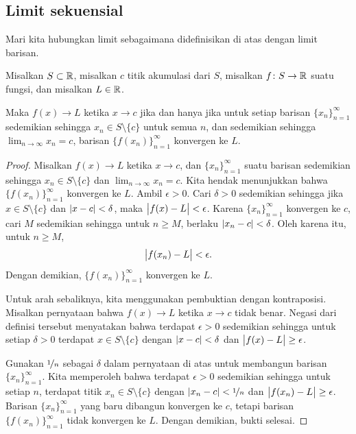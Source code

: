 \subsection{Limit sekuensial} \label{subseq:sequentiallimits}

Mari kita hubungkan limit sebagaimana didefinisikan di atas dengan limit barisan.

\begin{lemma}\label{seqflimit:lemma}
Misalkan $S \subset {\mathbb{R}}$, misalkan $c$ titik akumulasi dari $S$, misalkan $f \colon S \to
{\mathbb{R}}$ suatu fungsi, dan misalkan $L \in {\mathbb{R}}$.

Maka
$f(x) \to L$ ketika $x \to c$ jika dan hanya jika untuk setiap barisan
$\{ x_n \}_{n=1}^\infty$
sedemikian sehingga $x_n \in S \setminus \{c\}$ untuk semua $n$,
dan sedemikian sehingga $\lim_{n\to\infty} x_n = c$,
barisan $\bigl\{ f(x_n) \bigr\}_{n=1}^\infty$ konvergen ke $L$.
\end{lemma}

\begin{proof}
Misalkan
$f(x) \to L$ ketika $x \to c$, dan $\{ x_n \}_{n=1}^\infty$ suatu barisan
sedemikian sehingga
$x_n \in S \setminus \{c\}$ dan
$\lim_{n\to\infty} x_n = c$.
Kita hendak menunjukkan bahwa $\bigl\{ f(x_n) \bigr\}_{n=1}^\infty$ konvergen ke $L$.
Ambil $\epsilon > 0$.  Cari $\delta > 0$ sedemikian sehingga
jika $x \in S \setminus \{c\}$ dan $\lvert {x-c} \rvert < \delta$, maka
$\bigl\lvert {f(x) - L} \bigr\rvert < \epsilon$.  Karena
$\{ x_n \}_{n=1}^\infty$ konvergen ke $c$, cari $M$ sedemikian sehingga untuk $n \geq M$,
berlaku $\lvert {x_n - c} \rvert < \delta$.  Oleh karena itu, untuk $n \geq M$,
\begin{equation*}
\bigl\lvert {f(x_n) - L} \bigr\rvert < \epsilon .
\end{equation*}
Dengan demikian, $\bigl\{ f(x_n) \bigr\}_{n=1}^\infty$ konvergen ke $L$.

Untuk arah sebaliknya, kita menggunakan pembuktian dengan kontraposisi.  Misalkan
pernyataan bahwa $f(x) \to L$ ketika $x \to c$ tidak benar.  Negasi dari
definisi tersebut menyatakan bahwa terdapat $\epsilon > 0$ sedemikian sehingga untuk setiap
$\delta > 0$ terdapat $x \in S \setminus \{c\}$ dengan
$\lvert {x-c} \rvert < \delta$
dan $\bigl\lvert {f(x)-L} \bigr\rvert \geq \epsilon$.

Gunakan $\nicefrac{1}{n}$ sebagai $\delta$ dalam pernyataan di atas untuk
membangun barisan $\{ x_n \}_{n=1}^\infty$.  Kita memperoleh
bahwa terdapat $\epsilon > 0$ sedemikian sehingga untuk setiap $n$,
terdapat titik $x_n \in S \setminus \{c\}$ dengan
$\lvert {x_n-c} \rvert < \nicefrac{1}{n}$
dan $\bigl\lvert {f(x_n)-L} \bigr\rvert \geq \epsilon$.
Barisan $\{ x_n \}_{n=1}^\infty$ yang baru dibangun konvergen ke $c$, tetapi
barisan $\bigl\{ f(x_n) \bigr\}_{n=1}^\infty$ tidak konvergen ke $L$.
Dengan demikian, bukti selesai.
\end{proof}

